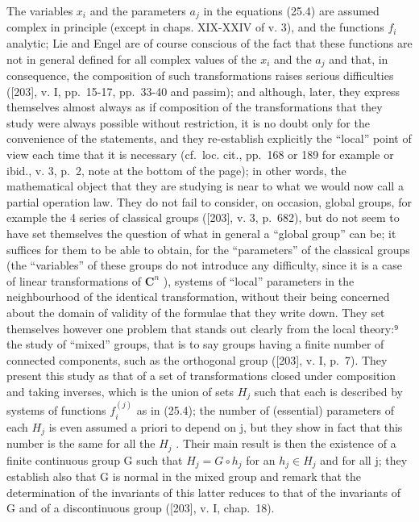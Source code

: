 The variables \(x_{i}\) and the parameters \(a_{j}\) in the equations (25.4) are assumed complex in principle (except in chaps. XIX-XXIV of v. 3), and the functions \(f_{i}\) analytic; Lie and Engel are of course conscious of the fact that these functions are not in general defined for all complex values of the \(x_{i}\) and the \(a_{j}\) and that, in consequence, the composition of such transformations raises serious difficulties ({[}203{]}, v. I, pp.~15-17, pp.~33-40 and passim); and although, later, they express themselves almost always as if composition of the transformations that they study were always possible without restriction, it is no doubt only for the convenience of the statements, and they re-establish explicitly the ``local'' point of view each time that it is necessary (cf.~loc. cit., pp.~168 or 189 for example or ibid., v. 3, p.~2, note at the bottom of the page); in other words, the mathematical object that they are studying is near to what we would now call a partial operation law. They do not fail to consider, on occasion, global groups, for example the 4 series of classical groups ({[}203{]}, v. 3, p.~682), but do not seem to have set themselves the question of what in general a ``global group'' can be; it suffices for them to be able to obtain, for the ``parameters'' of the classical groups (the ``variables'' of these groups do not introduce any difficulty, since it is a case of linear transformations of \(\mathbf{C}^n\) ), systems of ``local'' parameters in the neighbourhood of the identical transformation, without their being concerned about the domain of validity of the formulae that they write down. They set themselves however one problem that stands out clearly from the local theory:⁹ the study of ``mixed'' groups, that is to say groups having a finite number of connected components, such as the orthogonal group ({[}203{]}, v. I, p.~7). They present this study as that of a set of transformations closed under composition and taking inverses, which is the union of sets \(H_{j}\) such that each is described by systems of functions \(f_{i}^{(j)}\) as in (25.4); the number of (essential) parameters of each \(H_{j}\) is even assumed a priori to depend on j, but they show in fact that this number is the same for all the \(H_{j}\) . Their main result is then the existence of a finite continuous group G such that \(H_{j} = G \circ h_{j}\) for an \(h_{j} \in H_{j}\) and for all j; they establish also that G is normal in the mixed group and remark that the determination of the invariants of this latter reduces to that of the invariants of G and of a discontinuous group ({[}203{]}, v. I, chap.~18).

